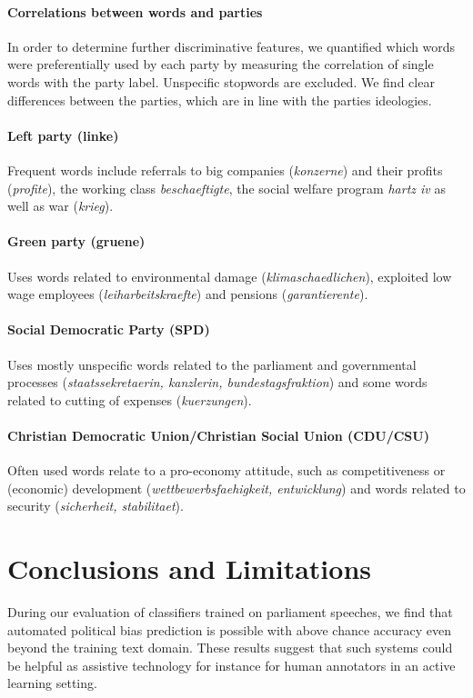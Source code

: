 \documentclass[11pt]{article}
\begin{document}
%
\paragraph{Correlations between words and parties}
In order to determine further discriminative features, we quantified which words were preferentially used by each party by measuring the correlation of single words with the party label. Unspecific stopwords are excluded. We find clear differences between the parties, which are in line with the parties ideologies. 
\paragraph{\bf Left party (linke)} Frequent words include referrals to big companies ({\em konzerne}) and their profits ({\em profite}), the working class {\em beschaeftigte}, the social welfare program {\em hartz iv} as well as war ({\em krieg}).
\paragraph{\bf Green party (gruene)} Uses words related to environmental damage ({\em klimaschaedlichen}), exploited low wage employees ({\em leiharbeitskraefte}) and pensions ({\em garantierente}).
\paragraph{\bf Social Democratic Party (SPD)} Uses mostly unspecific words related to the parliament and governmental processes ({\em staatssekretaerin, kanzlerin, bundestagsfraktion}) and some words related to cutting of expenses ({\em kuerzungen}).
\paragraph{\bf Christian Democratic Union/Christian Social Union (CDU/CSU)}
Often used words relate to a pro-economy attitude, such as competitiveness or (economic) development ({\em wettbewerbsfaehigkeit, entwicklung}) and words related to security ({\em sicherheit, stabilitaet}). 

\section{Conclusions and Limitations}\label{sec:conclusion}
During our evaluation of classifiers trained on parliament speeches, we find that automated political bias prediction is possible with above chance accuracy even beyond the training text domain. These results suggest that such systems could be helpful as assistive technology for instance for human annotators in an active learning setting. 
\end{document}
